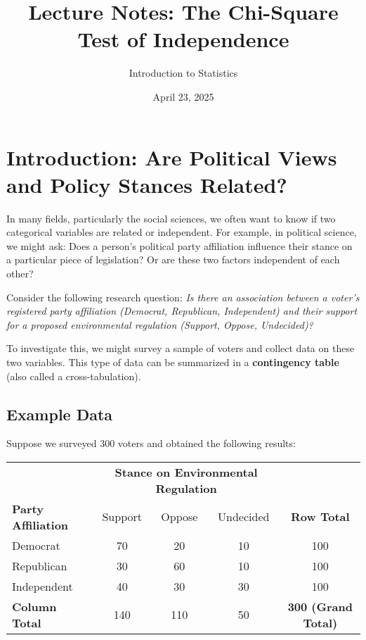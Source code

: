 \documentclass{article}
\title{Lecture Notes: The Chi-Square Test of Independence}
\author{Introduction to Statistics}
\date{April 23, 2025} %
\begin{document}
\maketitle

\section{Introduction: Are Political Views and Policy Stances Related?}

In many fields, particularly the social sciences, we often want to know if two categorical variables are related or independent. For example, in political science, we might ask: Does a person's political party affiliation influence their stance on a particular piece of legislation? Or are these two factors independent of each other?

Consider the following research question:
\emph{Is there an association between a voter's registered party affiliation (Democrat, Republican, Independent) and their support for a proposed environmental regulation (Support, Oppose, Undecided)?}

To investigate this, we might survey a sample of voters and collect data on these two variables. This type of data can be summarized in a \textbf{contingency table} (also called a cross-tabulation).

\subsection{Example Data}

Suppose we surveyed 300 voters and obtained the following results:

\begin{center}
\begin{tabular}{l c c c c}
\toprule
 & \multicolumn{3}{c}{\textbf{Stance on Environmental Regulation}} & \\
\cmidrule(lr){2-4}
\textbf{Party Affiliation} & Support & Oppose & Undecided & \textbf{Row Total} \\
\midrule
Democrat & 70 & 20 & 10 & 100 \\
Republican & 30 & 60 & 10 & 100 \\
Independent & 40 & 30 & 30 & 100 \\
\midrule
\textbf{Column Total} & 140 & 110 & 50 & \textbf{300 (Grand Total)} \\
\bottomrule
\end{tabular}
\end{center}
\end{document}
